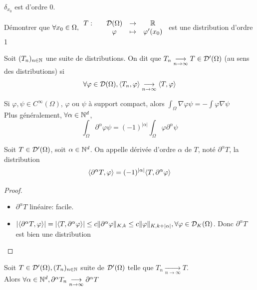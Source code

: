 \documentclass[]{report}
\begin{document}
    \begin{re}{}{}
        $\delta_{x_0}$ est d'ordre $0$.
    \end{re}

    \begin{exo}{}{}
        Démontrer que $\forall x_0\in \Omega, \begin{array}{ccccc} T : & & \mathcal{D}(\Omega) & \to & \mathbb{R} \\ & & \varphi & \mapsto & \varphi'(x_0) \end{array}$ est une distribution d'ordre 1
    \end{exo}

    \begin{df}{}{}
        Soit $(T_n)_{n\in\mathbb{N}}$ une suite de distributions. On dit que $T_n\underset{n\to \infty}{\longrightarrow} T \in \mathcal{D}'(\Omega)$ (au sens des distributions) si
        \[\forall \varphi\in \mathcal{D}(\Omega), \langle T_n,\varphi \rangle\underset{n\to \infty}{\longrightarrow} \langle T,\varphi \rangle\]
    \end{df}

    \begin{ra}{}{}
        Si $\varphi,\psi\in C^\infty(\Omega)$, $\varphi$ ou $\psi$ à support compact, alors $\int_\Omega \nabla \varphi \psi=-\int \varphi \nabla \psi$\\
        Plus généralement, $\forall \alpha \in \mathbb{N}^d$,
        \[\int_{\Omega}\partial^\alpha \varphi \psi=(-1)^{|\alpha|}\int_{\Omega} \varphi \partial^{\alpha} \psi\]
    \end{ra}

    \begin{df}{}{}
        Soit $T\in \mathcal{D}'(\Omega)$, soit $\alpha \in \mathbb{N}^d$. On appelle dérivée d'ordre $\alpha$ de $T$, noté $\partial^\alpha T$, la distribution
        \[\langle \partial^{\alpha} T,\varphi \rangle=(-1)^{|\alpha|}\langle T,\partial^{\alpha} \varphi \rangle\]
    \end{df}

    \begin{proof}
        \begin{itemize}
            \item $\partial^\alpha T$ linéaire: facile.
            \item $\left|\langle \partial^{\alpha} T,\varphi \rangle\right|= \left|\langle T,\partial^{\alpha} \varphi \rangle\right|\le c\lVert \partial^{\alpha}\varphi \rVert_{K,k}\le c\lVert \varphi \rVert_{K,k+|\alpha|},\forall \varphi\in \mathcal{D}_K(\Omega)$. Donc $\partial^{\alpha}T$ est bien une distribution
        \end{itemize}
    \end{proof}

    \begin{prop}{}{}
        Soit $T\in \mathcal{D}'(\Omega),(T_n)_{n\in\mathbb{N}}$ suite de $\mathcal{D}'(\Omega)$ telle que $T_n\underset{n\to\infty}{\longrightarrow}T$.\\
        Alors $\forall \alpha \in \mathbb{N}^d,\partial^\alpha T_n\underset{n\to\infty}{\longrightarrow}\partial^\alpha T$
    \end{prop}
\end{document}
